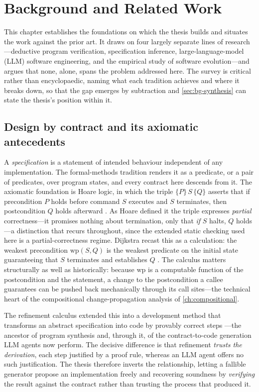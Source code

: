 \chapter{Background and Related Work}\label{ch:background}

This chapter establishes the foundations on which the thesis builds and situates
the work against the prior art. It draws on four largely separate lines of
research---deductive program verification, specification inference,
large-language-model (LLM) software engineering, and the empirical study of
software evolution---and argues that none, alone, spans the problem addressed here.
The survey is critical rather than encyclopaedic, naming what each tradition
achieves and where it breaks down, so that the gap emerges by subtraction and
\cref{sec:bg-synthesis} can state the thesis's position within it.

\section{Design by contract and its axiomatic antecedents}\label{sec:bg-dbc}

A \emph{specification} is a statement of intended behaviour independent of any
implementation. The formal-methods tradition renders it as a predicate, or a pair
of predicates, over program states, and every contract here descends from it. The
axiomatic foundation is Hoare logic, in which the triple $\{P\}\,S\,\{Q\}$ asserts
that if precondition $P$ holds before command $S$ executes and $S$ terminates, then
postcondition $Q$ holds afterward \cite{hoare1969axiomatic}. As Hoare defined it
the triple expresses \emph{partial} correctness---it promises nothing about
termination, only that \emph{if} $S$ halts, $Q$ holds---a distinction that recurs
throughout, since the extended static checking used here is a partial-correctness
regime. Dijkstra recast this as a calculation: the weakest precondition
$\mathrm{wp}(S,Q)$ is the weakest predicate on the initial state guaranteeing that
$S$ terminates and establishes $Q$ \cite{dijkstra1976discipline,dijkstra1975guarded}.
The calculus matters structurally as well as historically: because $\mathrm{wp}$
is a computable function of the postcondition and the statement, a change to the
postcondition a callee guarantees can be pushed back mechanically through its call
sites---the technical heart of the compositional change-propagation analysis of
\cref{ch:compositional}.

The refinement calculus extended this into a development method that transforms an
abstract specification into code by provably correct steps
\cite{back1998refinement,morgan1994programming}---the ancestor of program synthesis
and, through it, of the contract-to-code generation LLM agents now perform. The
decisive difference is that refinement \emph{trusts the derivation}, each step
justified by a proof rule, whereas an LLM agent offers no such justification. The
thesis therefore inverts the relationship, letting a fallible generator propose an
implementation freely and recovering soundness by \emph{verifying} the result
against the contract rather than trusting the process that produced it.

